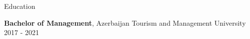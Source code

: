 \documentclass{resume} %
\begin{document}


\begin{rSection}{Education}
    
    {\bf Bachelor of Management}, Azerbaijan Tourism and Management University \hfill {2017 - 2021}


\end{rSection}



\end{document}
